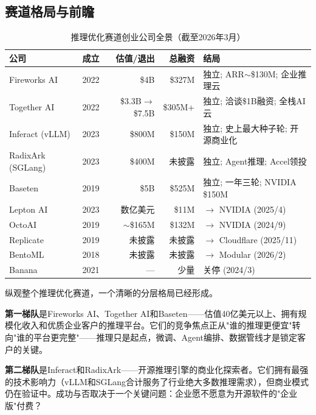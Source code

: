 \subsection{赛道格局与前瞻}
\label{subsec:inference-landscape}

\begin{table}[htbp]
\centering
\caption{推理优化赛道创业公司全景（截至2026年3月）}
\label{tab:inference-landscape}
\small
\begin{tabularx}{\textwidth}{l c r r X}
\toprule
\rowcolor{figLightGray}
\textbf{公司} & \textbf{成立} & \textbf{估值/退出} & \textbf{总融资} & \textbf{结局} \\
\midrule
Fireworks AI      & 2022 & \$4B & \$327M & 独立; ARR$\sim$\$130M; 企业推理云 \\
Together AI       & 2022 & \$3.3B$\to$\$7.5B & \$305M+ & 独立; 洽谈\$1B融资; 全栈AI云 \\
Inferact (vLLM)   & 2023 & \$800M & \$150M & 独立; 史上最大种子轮; 开源商业化 \\
RadixArk (SGLang) & 2023 & \$400M & 未披露 & 独立; Agent推理; Accel领投 \\
Baseten           & 2019 & \$5B & \$525M & 独立; 一年三轮; NVIDIA \$150M \\
Lepton AI         & 2023 & 数亿美元 & \$11M & $\to$ NVIDIA (2025/4) \\
OctoAI            & 2019 & $\sim$\$165M & \$132M & $\to$ NVIDIA (2024/9) \\
Replicate         & 2019 & 未披露 & 未披露 & $\to$ Cloudflare (2025/11) \\
BentoML           & 2018 & 未披露 & 未披露 & $\to$ Modular (2026/2) \\
Banana            & 2021 & --- & 少量 & 关停 (2024/3) \\
\bottomrule
\end{tabularx}
\end{table}

纵观整个推理优化赛道，一个清晰的分层格局已经形成。

\textbf{第一梯队}是Fireworks AI、Together AI和Baseten——估值40亿美元以上、拥有规模化收入和优质企业客户的推理平台。它们的竞争焦点正从"谁的推理更便宜"转向"谁的平台更完整"——推理只是起点，微调、Agent编排、数据管线才是锁定客户的关键。

\textbf{第二梯队}是Inferact和RadixArk——开源推理引擎的商业化探索者。它们拥有最强的技术影响力（vLLM和SGLang合计服务了行业绝大多数推理需求），但商业模式仍在验证中。成功与否取决于一个关键问题：企业愿不愿意为开源软件的"企业版"付费？

